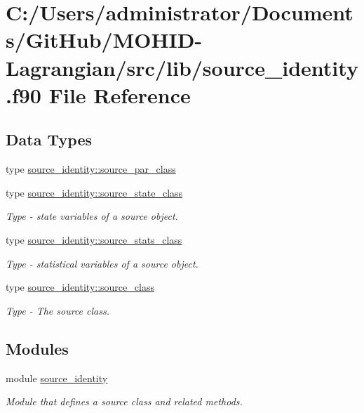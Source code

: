 \hypertarget{source__identity_8f90}{}\section{C\+:/\+Users/administrator/\+Documents/\+Git\+Hub/\+M\+O\+H\+I\+D-\/\+Lagrangian/src/lib/source\+\_\+identity.f90 File Reference}
\label{source__identity_8f90}
\subsection*{Data Types}
\begin{DoxyCompactItemize}
\item 
type \mbox{\hyperlink{structsource__identity_1_1source__par__class}{source\+\_\+identity\+::source\+\_\+par\+\_\+class}}
\item 
type \mbox{\hyperlink{structsource__identity_1_1source__state__class}{source\+\_\+identity\+::source\+\_\+state\+\_\+class}}
\begin{DoxyCompactList}\small\item\em Type -\/ state variables of a source object. \end{DoxyCompactList}\item 
type \mbox{\hyperlink{structsource__identity_1_1source__stats__class}{source\+\_\+identity\+::source\+\_\+stats\+\_\+class}}
\begin{DoxyCompactList}\small\item\em Type -\/ statistical variables of a source object. \end{DoxyCompactList}\item 
type \mbox{\hyperlink{structsource__identity_1_1source__class}{source\+\_\+identity\+::source\+\_\+class}}
\begin{DoxyCompactList}\small\item\em Type -\/ The source class. \end{DoxyCompactList}\end{DoxyCompactItemize}
\subsection*{Modules}
\begin{DoxyCompactItemize}
\item 
module \mbox{\hyperlink{namespacesource__identity}{source\+\_\+identity}}
\begin{DoxyCompactList}\small\item\em Module that defines a source class and related methods. \end{DoxyCompactList}\end{DoxyCompactItemize}
